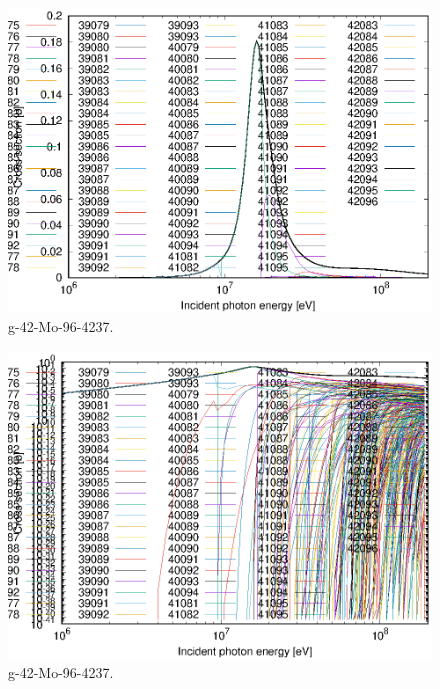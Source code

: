 \begin{figure}
 \includegraphics[width=\linewidth]{eps/g_42-Mo-96_4237.eps}
  \caption{g-42-Mo-96-4237.}
\end{figure}
\begin{figure}
 \includegraphics[width=\linewidth]{eps-log/g_42-Mo-96_4237.eps}
 \caption{g-42-Mo-96-4237.}
\end{figure}
\newpage \clearpage

